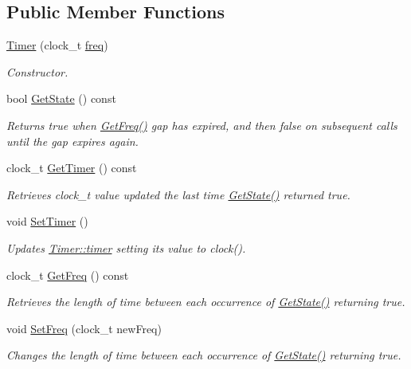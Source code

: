 \subsection*{Public Member Functions}
\begin{DoxyCompactItemize}
\item 
\hyperlink{class_timer_a40cd086bdd630d853370bd344bc782c6}{Timer} (clock\_\-t \hyperlink{class_timer_a79e2af3b256a4ef822dfd838d868f5ce}{freq})
\begin{DoxyCompactList}\small\item\em Constructor. \item\end{DoxyCompactList}\item 
bool \hyperlink{class_timer_a928753507fd1ea96ba00e7e4c3208058}{GetState} () const 
\begin{DoxyCompactList}\small\item\em Returns true when \hyperlink{class_timer_ac269f1e2ad463fad27b483036a8686a1}{GetFreq()} gap has expired, and then false on subsequent calls until the gap expires again. \item\end{DoxyCompactList}\item 
clock\_\-t \hyperlink{class_timer_ae84a65595eacc5198b4a5a03de5dd18a}{GetTimer} () const 
\begin{DoxyCompactList}\small\item\em Retrieves clock\_\-t value updated the last time \hyperlink{class_timer_a928753507fd1ea96ba00e7e4c3208058}{GetState()} returned true. \item\end{DoxyCompactList}\item 
\hypertarget{class_timer_a9390107e32bce6eec33469210096a0c0}{
void \hyperlink{class_timer_a9390107e32bce6eec33469210096a0c0}{SetTimer} ()}
\label{class_timer_a9390107e32bce6eec33469210096a0c0}

\begin{DoxyCompactList}\small\item\em Updates \hyperlink{class_timer_ac0cfb5de0274313d265e3fe634463491}{Timer::timer} setting its value to clock(). \item\end{DoxyCompactList}\item 
clock\_\-t \hyperlink{class_timer_ac269f1e2ad463fad27b483036a8686a1}{GetFreq} () const 
\begin{DoxyCompactList}\small\item\em Retrieves the length of time between each occurrence of \hyperlink{class_timer_a928753507fd1ea96ba00e7e4c3208058}{GetState()} returning true. \item\end{DoxyCompactList}\item 
void \hyperlink{class_timer_a5ebafd5ef6ed205e795eb30f2079a6bb}{SetFreq} (clock\_\-t newFreq)
\begin{DoxyCompactList}\small\item\em Changes the length of time between each occurrence of \hyperlink{class_timer_a928753507fd1ea96ba00e7e4c3208058}{GetState()} returning true. \item\end{DoxyCompactList}\end{DoxyCompactItemize}
